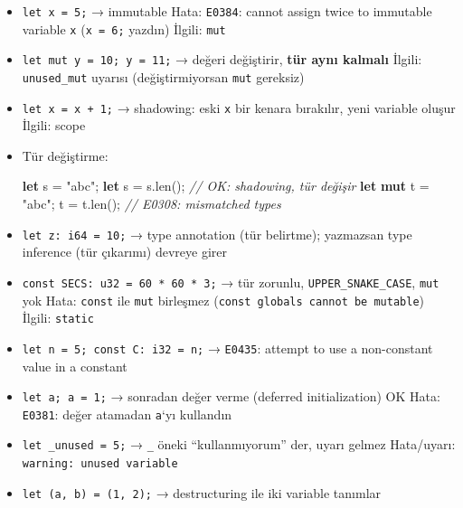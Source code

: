 \documentclass[12pt,a4paper]{article}
\newenvironment{Shaded}{}{}
\newcommand{\CommentTok}[1]{\textcolor[rgb]{0.38,0.63,0.69}{\textit{#1}}}
\newcommand{\FunctionTok}[1]{\textcolor[rgb]{0.02,0.16,0.49}{#1}}
\newcommand{\KeywordTok}[1]{\textcolor[rgb]{0.00,0.44,0.13}{\textbf{#1}}}
\newcommand{\NormalTok}[1]{#1}
\newcommand{\OperatorTok}[1]{\textcolor[rgb]{0.40,0.40,0.40}{#1}}
\newcommand{\StringTok}[1]{\textcolor[rgb]{0.25,0.44,0.63}{#1}}
\begin{document}
\begin{itemize}
\tightlist
\item
  \texttt{let\ x\ =\ 5;} → immutable
  Hata: \texttt{E0384}: cannot assign twice to immutable variable \texttt{x} (\texttt{x\ =\ 6;} yazdın)
  İlgili: \texttt{mut}
\item
  \texttt{let\ mut\ y\ =\ 10;\ y\ =\ 11;} → değeri değiştirir, \textbf{tür aynı kalmalı}
  İlgili: \texttt{unused\_mut} uyarısı (değiştirmiyorsan \texttt{mut} gereksiz)
\item
  \texttt{let\ x\ =\ x\ +\ 1;} → shadowing: eski \texttt{x} bir kenara bırakılır, yeni variable oluşur
  İlgili: scope
\item
  Tür değiştirme:

\begin{Shaded}
\begin{Highlighting}[]
\KeywordTok{let}\NormalTok{ s }\OperatorTok{=} \StringTok{"abc"}\OperatorTok{;}
\KeywordTok{let}\NormalTok{ s }\OperatorTok{=}\NormalTok{ s}\OperatorTok{.}\FunctionTok{len}\OperatorTok{();}      \CommentTok{// OK: shadowing, tür değişir}
\KeywordTok{let} \KeywordTok{mut}\NormalTok{ t }\OperatorTok{=} \StringTok{"abc"}\OperatorTok{;}
\NormalTok{t }\OperatorTok{=}\NormalTok{ t}\OperatorTok{.}\FunctionTok{len}\OperatorTok{();}          \CommentTok{// E0308: mismatched types}
\end{Highlighting}
\end{Shaded}
\item
  \texttt{let\ z:\ i64\ =\ 10;} → type annotation (tür belirtme); yazmazsan type inference (tür çıkarımı) devreye girer
\item
  \texttt{const\ SECS:\ u32\ =\ 60\ *\ 60\ *\ 3;} → tür zorunlu, \texttt{UPPER\_SNAKE\_CASE}, \texttt{mut} yok
  Hata: \texttt{const} ile \texttt{mut} birleşmez (\texttt{const\ globals\ cannot\ be\ mutable})
  İlgili: \texttt{static}
\item
  \texttt{let\ n\ =\ 5;\ const\ C:\ i32\ =\ n;} → \texttt{E0435}: attempt to use a non-constant value in a constant
\item
  \texttt{let\ a;\ a\ =\ 1;} → sonradan değer verme (deferred initialization) OK
  Hata: \texttt{E0381}: değer atamadan \texttt{a}`yı kullandın
\item
  \texttt{let\ \_unused\ =\ 5;} → \texttt{\_} öneki ``kullanmıyorum'' der, uyarı gelmez
  Hata/uyarı: \texttt{warning:\ unused\ variable}
\item
  \texttt{let\ (a,\ b)\ =\ (1,\ 2);} → destructuring ile iki variable tanımlar
\end{itemize}
\end{document}
